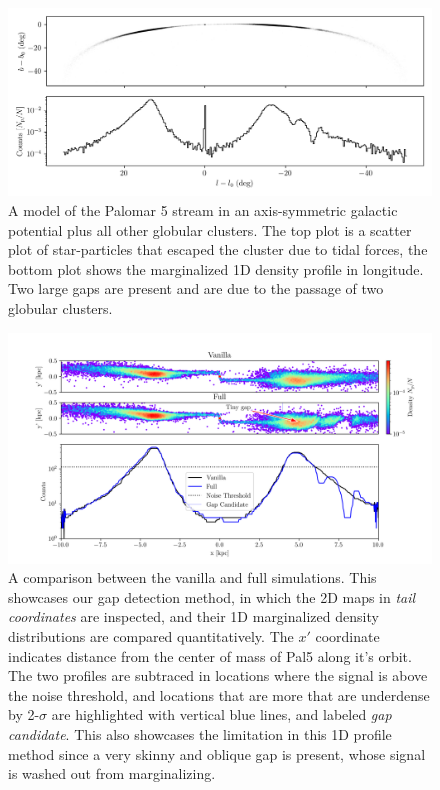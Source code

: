 \documentclass[]{aa}
\begin{document}
  \begin{figure}
    \centering
    \includegraphics[width=\linewidth]{stream_on_sky_Pal5_monte-carlo-009_pouliasis2017pii-GCNBody.png}
    \caption[]{A model of the Palomar 5 stream in an axis-symmetric galactic potential plus all other globular clusters. The top plot is a scatter plot of star-particles that escaped the cluster due to tidal forces, the bottom plot shows the marginalized 1D density profile in longitude. Two large gaps are present and are due to the passage of two globular clusters. }
    \end{figure}


  \begin{figure}
    \centering
    \includegraphics[width=\linewidth, trim=20 0 15 0]{monte-carlo-009-pouliasis2017pii-GCNBody-2000-milisigma-50-noisefactor-20-boxcarindexlength-shifted-0.png}
    \caption[]{A comparison between the vanilla and full simulations. This showcases our gap detection method, in which the 2D maps in \textit{tail coordinates} are inspected, and their 1D marginalized density distributions are compared quantitatively. The $x'$ coordinate indicates distance from the center of mass of Pal5 along it's orbit. The two profiles are subtraced in locations where the signal is above the noise threshold, and locations that are more that are underdense by 2-$\sigma$ are highlighted with vertical blue lines, and labeled \textit{gap candidate}. This also showcases the limitation in this 1D profile method since a very skinny and oblique gap is present, whose signal is washed out from marginalizing.}
    \label{fig:profiles}
    \end{figure}  
\end{document}
